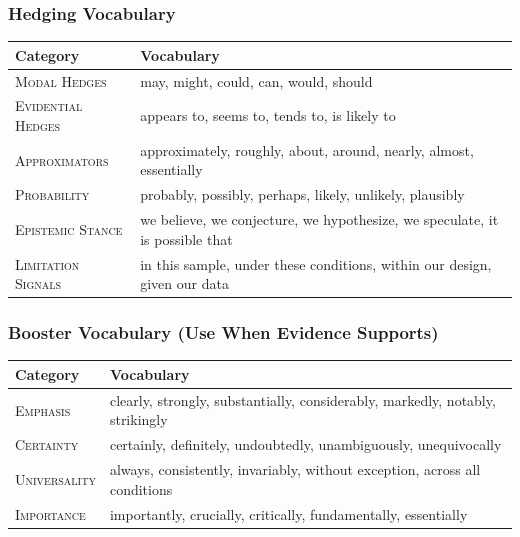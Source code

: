 \subsubsection{Hedging Vocabulary}

\begin{center}
\renewcommand{\arraystretch}{1.1}
\small
\begin{tabular}{p{2.5cm}p{10cm}}
\toprule
\textbf{Category} & \textbf{Vocabulary} \\
\midrule
\textsc{Modal Hedges} &
  may, might, could, can, would, should \\
\textsc{Evidential Hedges} &
  appears to, seems to, tends to, is likely to \\
\textsc{Approximators} &
  approximately, roughly, about, around, nearly, almost, essentially \\
\textsc{Probability} &
  probably, possibly, perhaps, likely, unlikely, plausibly \\
\textsc{Epistemic Stance} &
  we believe, we conjecture, we hypothesize, we speculate, it is possible that \\
\textsc{Limitation Signals} &
  in this sample, under these conditions, within our design, given our data \\
\bottomrule
\end{tabular}
\end{center}

\subsubsection{Booster Vocabulary (Use When Evidence Supports)}

\begin{center}
\renewcommand{\arraystretch}{1.1}
\small
\begin{tabular}{p{2.5cm}p{10cm}}
\toprule
\textbf{Category} & \textbf{Vocabulary} \\
\midrule
\textsc{Emphasis} &
  clearly, strongly, substantially, considerably, markedly, notably, strikingly \\
\textsc{Certainty} &
  certainly, definitely, undoubtedly, unambiguously, unequivocally \\
\textsc{Universality} &
  always, consistently, invariably, without exception, across all conditions \\
\textsc{Importance} &
  importantly, crucially, critically, fundamentally, essentially \\
\bottomrule
\end{tabular}
\end{center}

